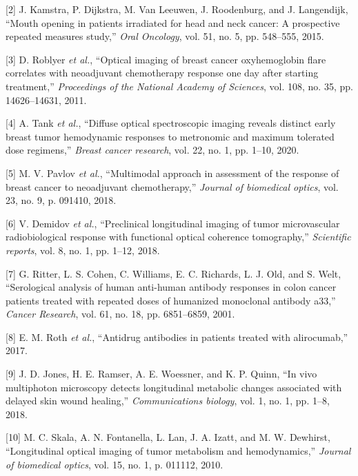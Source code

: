 \documentclass[
]{article}
\begin{document}
\leavevmode\hypertarget{ref-kamstra2015}{}%
{[}2{]} J. Kamstra, P. Dijkstra, M. Van Leeuwen, J. Roodenburg, and J. Langendijk, ``Mouth opening in patients irradiated for head and neck cancer: A prospective repeated measures study,'' \emph{Oral Oncology}, vol. 51, no. 5, pp. 548--555, 2015.

\leavevmode\hypertarget{ref-roblyer2011}{}%
{[}3{]} D. Roblyer \emph{et al.}, ``Optical imaging of breast cancer oxyhemoglobin flare correlates with neoadjuvant chemotherapy response one day after starting treatment,'' \emph{Proceedings of the National Academy of Sciences}, vol. 108, no. 35, pp. 14626--14631, 2011.

\leavevmode\hypertarget{ref-tank2020}{}%
{[}4{]} A. Tank \emph{et al.}, ``Diffuse optical spectroscopic imaging reveals distinct early breast tumor hemodynamic responses to metronomic and maximum tolerated dose regimens,'' \emph{Breast cancer research}, vol. 22, no. 1, pp. 1--10, 2020.

\leavevmode\hypertarget{ref-pavlov2018}{}%
{[}5{]} M. V. Pavlov \emph{et al.}, ``Multimodal approach in assessment of the response of breast cancer to neoadjuvant chemotherapy,'' \emph{Journal of biomedical optics}, vol. 23, no. 9, p. 091410, 2018.

\leavevmode\hypertarget{ref-demidov2018}{}%
{[}6{]} V. Demidov \emph{et al.}, ``Preclinical longitudinal imaging of tumor microvascular radiobiological response with functional optical coherence tomography,'' \emph{Scientific reports}, vol. 8, no. 1, pp. 1--12, 2018.

\leavevmode\hypertarget{ref-ritter2001}{}%
{[}7{]} G. Ritter, L. S. Cohen, C. Williams, E. C. Richards, L. J. Old, and S. Welt, ``Serological analysis of human anti-human antibody responses in colon cancer patients treated with repeated doses of humanized monoclonal antibody a33,'' \emph{Cancer Research}, vol. 61, no. 18, pp. 6851--6859, 2001.

\leavevmode\hypertarget{ref-roth2017}{}%
{[}8{]} E. M. Roth \emph{et al.}, ``Antidrug antibodies in patients treated with alirocumab,'' 2017.

\leavevmode\hypertarget{ref-jones2018}{}%
{[}9{]} J. D. Jones, H. E. Ramser, A. E. Woessner, and K. P. Quinn, ``In vivo multiphoton microscopy detects longitudinal metabolic changes associated with delayed skin wound healing,'' \emph{Communications biology}, vol. 1, no. 1, pp. 1--8, 2018.

\leavevmode\hypertarget{ref-skala2010}{}%
{[}10{]} M. C. Skala, A. N. Fontanella, L. Lan, J. A. Izatt, and M. W. Dewhirst, ``Longitudinal optical imaging of tumor metabolism and hemodynamics,'' \emph{Journal of biomedical optics}, vol. 15, no. 1, p. 011112, 2010.
\end{document}

